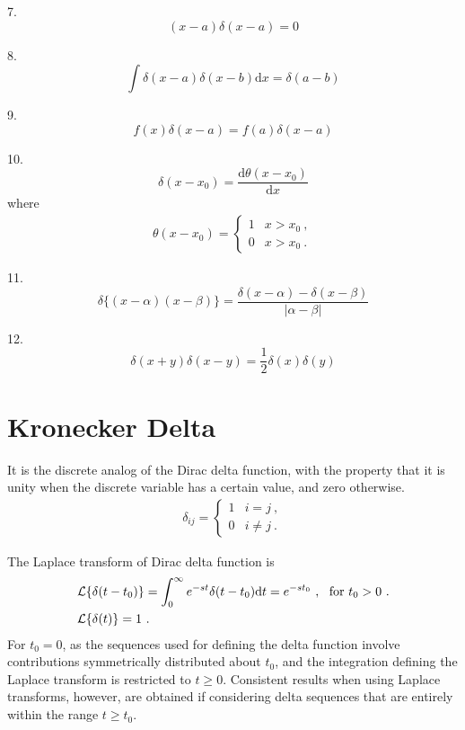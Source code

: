 \documentclass[12pt,a4paper]{article}
\newcommand{\dif}{\mathrm{d}}
\begin{document}
7.
\begin{equation}
(x-a) \delta(x-a) = 0
\end{equation}

8.
\begin{equation}
\int \delta(x-a) \delta(x-b) \dif x = \delta(a -b)
\end{equation}

9.
\begin{equation}
f(x) \delta(x-a) = f(a) \delta(x-a)
\end{equation}

10.
\begin{equation}
\delta(x-x_0) = \frac{\dif \theta(x-x_0)}{\dif x}
\end{equation}
where
\begin{align}
\theta(x-x_0) = \begin{cases} 
1 & x > x_0 ~,\\
0 & x > x_0 ~.
\end{cases}
\end{align}

11.
\begin{equation}
\delta\{(x-\alpha)(x-\beta) \} = \frac{\delta(x-\alpha) -\delta(x-\beta)}{|\alpha -\beta|}
\end{equation}

12.
\begin{equation}
\delta(x+y)\delta(x-y) = \frac{1}{2} \delta(x)\delta(y)
\end{equation}

\section{Kronecker Delta}
It is the discrete analog of the Dirac delta function, with the property that it is unity when the discrete variable has a certain value, and zero otherwise. 
\begin{align}
\delta_{ij} = \begin{cases} 
1 & i = j ~,\\
0 & i \neq j ~.
\end{cases}
\end{align}





The Laplace transform of Dirac delta function is
\begin{align}
& \mathcal L \{\delta(t-t_0) \} = \int_0^\infty e^{-st} \delta(t-t_0) \dif t = e^{-st_0} ~, ~~ {\rm for} ~ t_0 > 0 ~. \\
& \mathcal L \{\delta(t) \} = 1 ~.
\end{align}
For $t_0 = 0$, as the sequences used for defining the delta function involve contributions symmetrically distributed about $t_0$, and the integration defining the Laplace transform is restricted to $t \geqslant 0$. Consistent results when using Laplace transforms, however, are obtained if considering delta sequences that are entirely within the range $t \geqslant t_0$.
\end{document}
